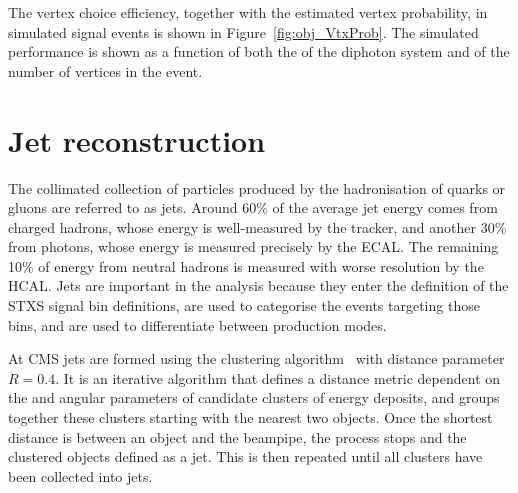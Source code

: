 The vertex choice efficiency, together with the estimated vertex probability,
in simulated \Hgg signal events is shown in Figure~\ref{fig:obj_VtxProb}.
The simulated performance is shown as a function of both the \pt of the diphoton
system and of the number of vertices in the event.

\section{Jet reconstruction}

The collimated collection of particles produced by the hadronisation of quarks or gluons are referred to as jets.
Around 60\% of the average jet energy comes from charged hadrons, whose energy is well-measured by the tracker,
and another 30\% from photons, whose energy is measured precisely by the ECAL.
The remaining 10\% of energy from neutral hadrons is measured with worse resolution by the HCAL.
Jets are important in the \Hgg analysis because they enter the definition of the STXS signal bin definitions, 
are used to categorise the events targeting those bins, 
and are used to differentiate between production modes.

At CMS jets are formed using the \akt clustering algorithm~\cite{AntiKt} with distance parameter $R=0.4$. %
It is an iterative algorithm that defines a distance metric dependent on the \pt and angular parameters of candidate clusters of energy deposits, 
and groups together these clusters starting with the nearest two objects.
Once the shortest distance is between an object and the beampipe, the process stops and the clustered objects defined as a jet.
This is then repeated until all clusters have been collected into jets.

